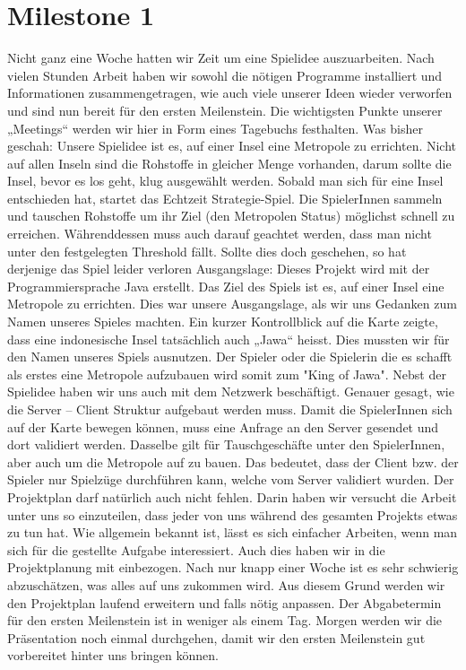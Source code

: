 \documentclass{scrartcl}
\newcommand{\n}{\newline}
\begin{document}
\section*{Milestone 1}
Nicht ganz eine Woche hatten wir Zeit um eine Spielidee auszuarbeiten. Nach vielen Stunden Arbeit haben wir sowohl die nötigen Programme installiert und Informationen zusammengetragen, wie auch viele unserer Ideen wieder verworfen und sind nun bereit für den ersten Meilenstein. Die wichtigsten Punkte unserer „Meetings“ werden wir hier in Form eines Tagebuchs festhalten. 
\n
\n
Was bisher geschah:
\n
Unsere Spielidee ist es, auf einer Insel eine Metropole zu errichten. Nicht auf allen Inseln sind die Rohstoffe in gleicher Menge vorhanden, darum sollte die Insel, bevor es los geht, klug ausgewählt werden. Sobald man sich für eine Insel entschieden hat, startet das Echtzeit Strategie-Spiel. Die SpielerInnen sammeln und tauschen Rohstoffe um ihr Ziel (den Metropolen Status) möglichst schnell zu erreichen. Währenddessen muss auch darauf geachtet werden, dass man nicht unter den festgelegten Threshold fällt. Sollte dies doch geschehen, so hat derjenige das Spiel leider verloren
\n 
Ausgangslage: Dieses Projekt wird mit der Programmiersprache Java erstellt. Das Ziel des Spiels ist es, auf einer Insel eine Metropole zu errichten. Dies war unsere Ausgangslage, als wir uns Gedanken zum Namen unseres Spieles machten. Ein kurzer Kontrollblick auf die Karte zeigte, dass eine indonesische Insel tatsächlich auch „Jawa“ heisst. Dies mussten wir für den Namen unseres Spiels ausnutzen. Der Spieler oder die Spielerin die es schafft als erstes eine Metropole aufzubauen wird somit zum "King of Jawa".
\n
Nebst der Spielidee haben wir uns auch mit dem Netzwerk beschäftigt. Genauer gesagt, wie die Server – Client Struktur aufgebaut werden muss. Damit die SpielerInnen sich auf der Karte bewegen können, muss eine Anfrage an den Server gesendet und dort validiert werden. Dasselbe gilt für Tauschgeschäfte unter den SpielerInnen, aber auch um die Metropole auf zu bauen. Das bedeutet, dass der Client bzw. der Spieler nur Spielzüge durchführen kann, welche vom Server validiert wurden.
\n
Der Projektplan darf natürlich auch nicht fehlen. Darin haben wir versucht die Arbeit unter uns so einzuteilen, dass jeder von uns während des gesamten Projekts etwas zu tun hat. Wie allgemein bekannt ist, lässt es sich einfacher Arbeiten, wenn man sich für die gestellte Aufgabe interessiert. Auch dies haben wir in die Projektplanung mit einbezogen. Nach nur knapp einer Woche ist es sehr schwierig abzuschätzen, was alles auf uns zukommen wird. Aus diesem Grund werden wir den Projektplan laufend erweitern und falls nötig anpassen.
\n
Der Abgabetermin für den ersten Meilenstein ist in weniger als einem Tag. Morgen werden wir die Präsentation noch einmal durchgehen, damit wir den ersten Meilenstein gut vorbereitet hinter uns bringen können.
\end{document}
